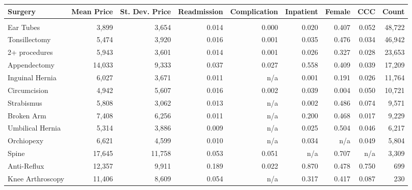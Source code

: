 \begin{table}[H]
\centering
\begin{tabular}{lrrrrrrrr}
\toprule
Surgery & Mean Price & St. Dev. Price & Readmission & Complication & Inpatient & Female & CCC & Count\\
\midrule
\addlinespace[0.3em]
\multicolumn{9}{l}{\textbf{Children's Hospitals}}\\
\hspace{1em}Ear Tubes & 3,899 & 3,654 & 0.014 & 0.000 & 0.020 & 0.407 & 0.052 & 48,722\\
\hspace{1em}Tonsillectomy & 5,474 & 3,920 & 0.016 & 0.001 & 0.035 & 0.476 & 0.034 & 46,942\\
\hspace{1em}2+ procedures & 5,943 & 3,601 & 0.014 & 0.001 & 0.026 & 0.327 & 0.028 & 23,653\\
\hspace{1em}Appendectomy & 14,033 & 9,333 & 0.037 & 0.027 & 0.558 & 0.409 & 0.039 & 17,209\\
\hspace{1em}Inguinal Hernia & 6,027 & 3,671 & 0.011 & n/a & 0.001 & 0.191 & 0.026 & 11,764\\
\hspace{1em}Circumcision & 4,942 & 5,607 & 0.016 & 0.002 & 0.039 & 0.004 & 0.050 & 10,721\\
\hspace{1em}Strabismus & 5,808 & 3,062 & 0.013 & n/a & 0.002 & 0.486 & 0.074 & 9,571\\
\hspace{1em}Broken Arm & 7,408 & 6,256 & 0.011 & n/a & 0.200 & 0.468 & 0.017 & 9,229\\
\hspace{1em}Umbilical Hernia & 5,314 & 3,886 & 0.009 & n/a & 0.025 & 0.504 & 0.046 & 6,217\\
\hspace{1em}Orchiopexy & 6,621 & 4,599 & 0.010 & n/a & 0.034 & n/a & 0.049 & 5,804\\
\hspace{1em}Spine & 17,645 & 11,758 & 0.053 & 0.051 & n/a & 0.707 & n/a & 3,309\\
\hspace{1em}Anti-Reflux & 12,357 & 9,911 & 0.189 & 0.022 & 0.870 & 0.478 & 0.750 & 699\\
\hspace{1em}Knee Arthroscopy & 11,406 & 8,609 & 0.054 & n/a & 0.317 & 0.417 & 0.087 & 230\\

\end{tabular}
\end{table}
